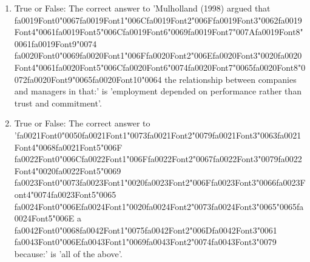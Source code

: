 \documentclass[12pt]{article}
\begin{document}
\begin{enumerate}[label=\arabic*.]
\item True or False: The correct answer to 'Mulholland (1998) argued that {\csname fa0019Font0\endcsname\char"0067}{\csname fa0019Font1\endcsname\char"006C}{\csname fa0019Font2\endcsname\char"006F}{\csname fa0019Font3\endcsname\char"0062}{\csname fa0019Font4\endcsname\char"0061}{\csname fa0019Font5\endcsname\char"006C}{\csname fa0019Font6\endcsname\char"0069}{\csname fa0019Font7\endcsname\char"007A}{\csname fa0019Font8\endcsname\char"0061}{\csname fa0019Font9\endcsname\char"0074} {\csname fa0020Font0\endcsname\char"0069}{\csname fa0020Font1\endcsname\char"006F}{\csname fa0020Font2\endcsname\char"006E}{\csname fa0020Font3\endcsname\char"0020}{\csname fa0020Font4\endcsname\char"0061}{\csname fa0020Font5\endcsname\char"006C}{\csname fa0020Font6\endcsname\char"0074}{\csname fa0020Font7\endcsname\char"0065}{\csname fa0020Font8\endcsname\char"0072}{\csname fa0020Font9\endcsname\char"0065}{\csname fa0020Font10\endcsname\char"0064} the relationship between companies and managers in that:' is 'employment depended on performance rather than trust and commitment'.
\item True or False: The correct answer to '{\csname fa0021Font0\endcsname\char"0050}{\csname fa0021Font1\endcsname\char"0073}{\csname fa0021Font2\endcsname\char"0079}{\csname fa0021Font3\endcsname\char"0063}{\csname fa0021Font4\endcsname\char"0068}{\csname fa0021Font5\endcsname\char"006F} {\csname fa0022Font0\endcsname\char"006C}{\csname fa0022Font1\endcsname\char"006F}{\csname fa0022Font2\endcsname\char"0067}{\csname fa0022Font3\endcsname\char"0079}{\csname fa0022Font4\endcsname\char"0020}{\csname fa0022Font5\endcsname\char"0069} {\csname fa0023Font0\endcsname\char"0073}{\csname fa0023Font1\endcsname\char"0020}{\csname fa0023Font2\endcsname\char"006F}{\csname fa0023Font3\endcsname\char"0066}{\csname fa0023Font4\endcsname\char"0074}{\csname fa0023Font5\endcsname\char"0065} {\csname fa0024Font0\endcsname\char"006E}{\csname fa0024Font1\endcsname\char"0020}{\csname fa0024Font2\endcsname\char"0073}{\csname fa0024Font3\endcsname\char"0065}{\char"0065}{\csname fa0024Font5\endcsname\char"006E} a {\csname fa0042Font0\endcsname\char"0068}{\csname fa0042Font1\endcsname\char"0075}{\csname fa0042Font2\endcsname\char"006D}{\csname fa0042Font3\endcsname\char"0061} {\csname fa0043Font0\endcsname\char"006E}{\csname fa0043Font1\endcsname\char"0069}{\csname fa0043Font2\endcsname\char"0074}{\csname fa0043Font3\endcsname\char"0079} because:' is 'all of the above'.

\end{enumerate}
\end{document}

